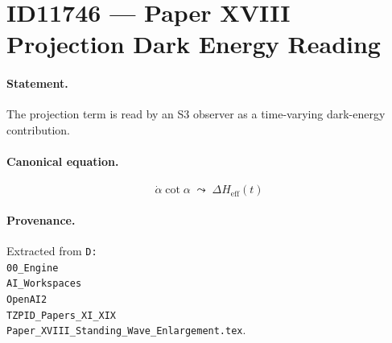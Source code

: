 \section*{ID11746 --- Paper XVIII Projection Dark Energy Reading}

\paragraph{Statement.}
The projection term is read by an S3 observer as a time-varying dark-energy contribution.

\paragraph{Canonical equation.}
\[
\dot\alpha\cot\alpha\;\leadsto\;\Delta H_{\mathrm{eff}}(t)
\]

\paragraph{Provenance.}
Extracted from \texttt{D:\\00\_Engine\\AI\_Workspaces\\OpenAI2\\TZPID\_Papers\_XI\_XIX\\Paper\_XVIII\_Standing\_Wave\_Enlargement.tex}.
